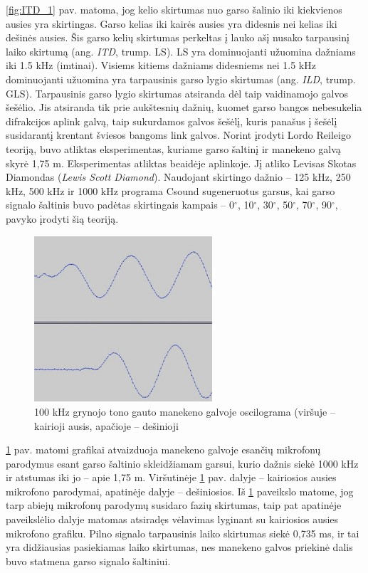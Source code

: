 \documentclass[]{vgtuef}
\begin{document}
\ref{fig:ITD_1} pav. matoma, jog kelio skirtumas nuo garso šalinio iki kiekvienos ausies yra skirtingas. Garso kelias iki kairės ausies yra didesnis nei kelias iki dešinės ausies. Šis garso kelių skirtumas perkeltas į lauko ašį nusako tarpausinį laiko skirtumą (ang. \textit{ITD}, trump. LS).
LS yra dominuojanti užuomina dažniams iki 1.5 kHz (imtinai). Visiems kitiems dažniams didesniems nei 1.5 kHz dominuojanti užuomina yra tarpausinis garso lygio skirtumas (ang. \textit{ILD}, trump. GLS). Tarpausinis garso lygio skirtumas atsiranda dėl taip vaidinamojo galvos šešėlio. Jis atsiranda tik prie aukštesnių dažnių, kuomet garso bangos nebesukelia difrakcijos aplink galvą, taip sukurdamos galvos šešėlį, kuris panašus į šešėlį susidarantį krentant šviesos bangoms link galvos.
Norint įrodyti Lordo Reileigo teoriją, buvo atliktas eksperimentas, kuriame garso šaltinį ir manekeno galvą skyrė 1,75 m. Eksperimentas atliktas beaidėje aplinkoje. Jį atliko Levisas Skotas Diamondas (\textit{Lewis Scott Diamond}).  Naudojant skirtingo dažnio – 125 kHz, 250 kHz, 500 kHz ir 1000 kHz programa Csound sugeneruotus garsus, kai garso signalo šaltinis buvo padėtas skirtingais kampais – 0$^\circ$, 10$^\circ$, 30$^\circ$, 50$^\circ$, 70$^\circ$, 90$^\circ$, pavyko įrodyti šią teoriją.

\begin{figure}[!ht]
  \centering
  \includegraphics[width=250px]{img/100kHz_grynas.png}
  \caption{100 kHz grynojo tono gauto manekeno galvoje oscilograma (viršuje – kairioji ausis, apačioje – dešinioji}
  \label{fig:100kHz_grynas}
\end{figure}

\ref{fig:100kHz_grynas} pav. matomi grafikai atvaizduoja manekeno galvoje esančių mikrofonų parodymus esant garso šaltinio skleidžiamam garsui, kurio dažnis siekė 1000 kHz ir atstumas iki jo – apie 1,75 m. Viršutinėje \ref{fig:100kHz_grynas} pav. dalyje – kairiosios ausies mikrofono parodymai, apatinėje dalyje – dešiniosios. Iš \ref{fig:100kHz_grynas} paveikslo matome, jog tarp abiejų mikrofonų parodymų susidaro fazių skirtumas, taip pat apatinėje paveikslėlio dalyje matomas atsiradęs vėlavimas lyginant su kairiosios ausies mikrofono grafiku. Pilno signalo tarpausinis laiko skirtumas siekė 0,735 ms, ir tai yra didžiausias pasiekiamas laiko skirtumas, nes manekeno galvos priekinė dalis buvo statmena garso signalo šaltiniui.
\end{document}
